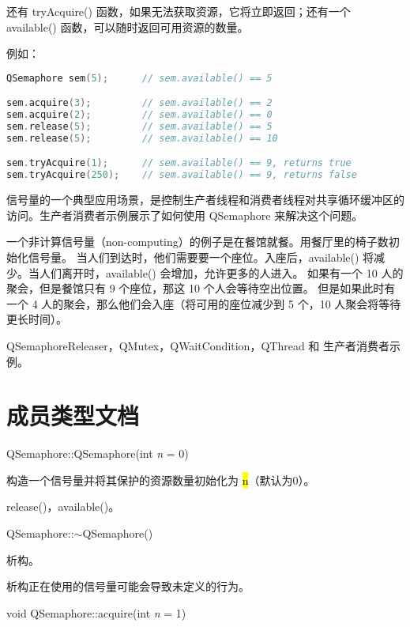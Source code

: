 还有 tryAcquire() 函数，如果无法获取资源，它将立即返回；还有一个 available() 函数，可以随时返回可用资源的数量。

例如：

\begin{lstlisting}[language=C++]
QSemaphore sem(5);      // sem.available() == 5

sem.acquire(3);         // sem.available() == 2
sem.acquire(2);         // sem.available() == 0
sem.release(5);         // sem.available() == 5
sem.release(5);         // sem.available() == 10

sem.tryAcquire(1);      // sem.available() == 9, returns true
sem.tryAcquire(250);    // sem.available() == 9, returns false
\end{lstlisting}

信号量的一个典型应用场景，是控制生产者线程和消费者线程对共享循环缓冲区的访问。生产者消费者示例展示了如何使用 QSemaphore 来解决这个问题。

一个非计算信号量（non-computing）的例子是在餐馆就餐。用餐厅里的椅子数初始化信号量。
当人们到达时，他们需要要一个座位。入座后，available() 将减少。当人们离开时，available() 会增加，允许更多的人进入。
如果有一个 10 人的聚会，但是餐馆只有 9 个座位，那这 10 个人会等待空出位置。
但是如果此时有一个 4 人的聚会，那么他们会入座（将可用的座位减少到 5 个，10 人聚会将等待更长时间）。

\begin{seeAlso}
QSemaphoreReleaser，QMutex，QWaitCondition，QThread 和 生产者消费者示例。
\end{seeAlso}

\section{成员类型文档}

QSemaphore::QSemaphore(int \emph{n} = 0)

构造一个信号量并将其保护的资源数量初始化为 \hl{n}（默认为0）。

\begin{seeAlso}
release()，available()。
\end{seeAlso}

QSemaphore::$\sim$QSemaphore()

析构。

\begin{warning}
析构正在使用的信号量可能会导致未定义的行为。
\end{warning}

void QSemaphore::acquire(int \emph{n} = 1)

